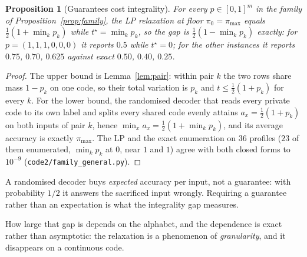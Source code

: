 \documentclass[11pt]{article}
\newtheorem{proposition}{Proposition}
\begin{document}
\begin{proposition}[Guarantees cost integrality]\label{prop:gap}
For every $p\in[0,1]^m$ in the family of Proposition~\ref{prop:family}, the LP relaxation at
floor $\pi_0=\pi_{\max}$ equals $\frac12(1+\min_k p_k)$ while $t^\star=\min_k p_k$, so the gap is
$\frac12(1-\min_k p_k)$ exactly: for $p=(1,1,1,0,0,0)$ it reports $0.5$ while $t^\star=0$; for the
other instances it reports $0.75$, $0.70$, $0.625$ against exact $0.50$, $0.40$, $0.25$.
\end{proposition}
\begin{proof}
The upper bound is Lemma~\ref{lem:pair}: within pair $k$ the two rows share mass $1-p_k$ on one
code, so their total variation is $p_k$ and $t\le\frac12(1+p_k)$ for every $k$. For the lower
bound, the randomised decoder that reads every private code to its own label and splits every
shared code evenly attains $a_x=\frac12(1+p_k)$ on both inputs of pair $k$, hence
$\min_x a_x=\frac12(1+\min_k p_k)$, and its average accuracy is exactly $\pi_{\max}$. The LP and
the exact enumeration on $36$ profiles ($23$ of them enumerated, $\min_k p_k$ at $0$, near $1$ and
$1$) agree with both closed forms to $10^{-9}$ (\texttt{code2/family\_general.py}).
\end{proof}
A randomised decoder buys \emph{expected} accuracy per input, not a guarantee: with probability
$1/2$ it answers the sacrificed input wrongly. Requiring a guarantee rather than an expectation
is what the integrality gap measures.

How large that gap is depends on the alphabet, and the dependence is exact rather than
asymptotic: the relaxation is a phenomenon of \emph{granularity}, and it disappears on a
continuous code.
\end{document}

